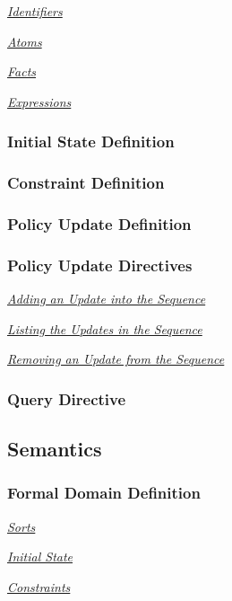 \documentclass[10pt, twocolumn]{article}
\begin{document}
        \noindent\underline{\emph{Identifiers}}

        \noindent\underline{\emph{Atoms}}

        \noindent\underline{\emph{Facts}}

        \noindent\underline{\emph{Expressions}}

      \subsubsection{Initial State Definition}

      \subsubsection{Constraint Definition}

      \subsubsection{Policy Update Definition}

      \subsubsection{Policy Update Directives}

        \noindent\underline{\emph{Adding an Update into the Sequence}}

        \noindent\underline{\emph{Listing the Updates in the Sequence}}

        \noindent\underline{\emph{Removing an Update from the Sequence}}

      \subsubsection{Query Directive}

    \subsection{Semantics}

      \subsubsection{Formal Domain Definition}

        \noindent\underline{\emph{Sorts}}

        \noindent\underline{\emph{Initial State}}

        \noindent\underline{\emph{Constraints}}
\end{document}
